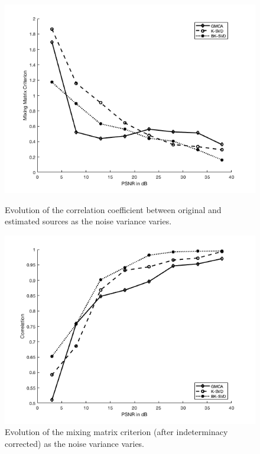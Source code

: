\begin{figure}[!htbp]
\centering
\begin{minipage}[b]{0.49\textwidth}
\includegraphics[width=\textwidth]{images/adpt_plot1.png}
\caption{Evolution of the correlation coefficient between original and estimated sources as the noise variance varies.}
\label{BSS_EV21}
\end{minipage}
\begin{minipage}[b]{0.49\textwidth}
\includegraphics[width=\textwidth]{images/apt_plot2.png}
\caption{Evolution of the mixing matrix criterion (after indeterminacy corrected) as the noise variance varies.}
\label{BSS_EV22}
\end{minipage}
\end{figure}

